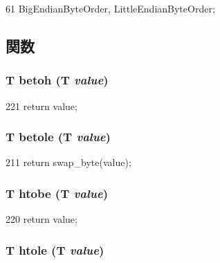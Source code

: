 \begin{DoxyCode}
61 {BigEndianByteOrder, LittleEndianByteOrder};
\end{DoxyCode}


\subsection{関数}
\hypertarget{byteswap_8hh_a2af77d34ef12718184be94c5b14a27ce}{
\subsubsection[{betoh}]{\setlength{\rightskip}{0pt plus 5cm}T betoh (T {\em value})}}
\label{byteswap_8hh_a2af77d34ef12718184be94c5b14a27ce}



\begin{DoxyCode}
221 {return value;}
\end{DoxyCode}
\hypertarget{byteswap_8hh_a8406bc904f1bcbe3e7988be84d7713d3}{
\subsubsection[{betole}]{\setlength{\rightskip}{0pt plus 5cm}T betole (T {\em value})}}
\label{byteswap_8hh_a8406bc904f1bcbe3e7988be84d7713d3}



\begin{DoxyCode}
211 {return swap_byte(value);}
\end{DoxyCode}
\hypertarget{byteswap_8hh_a0ec9bd801b3cff46ad2537234f1f1a67}{
\subsubsection[{htobe}]{\setlength{\rightskip}{0pt plus 5cm}T htobe (T {\em value})}}
\label{byteswap_8hh_a0ec9bd801b3cff46ad2537234f1f1a67}



\begin{DoxyCode}
220 {return value;}
\end{DoxyCode}
\hypertarget{byteswap_8hh_ac65420460fe8f6fd2a34e80843fc514a}{
\subsubsection[{htole}]{\setlength{\rightskip}{0pt plus 5cm}T htole (T {\em value})}}
\label{byteswap_8hh_ac65420460fe8f6fd2a34e80843fc514a}



